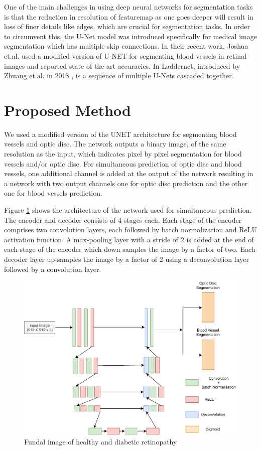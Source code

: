 One of the main challenges in using deep neural networks for segmentation tasks is that the reduction in resolution of featuremap as one goes deeper will result in loss of finer details like edges, which are crucial for segmentation tasks.
In order to circumvent this, the U-Net \cite{ronneberger2015u} model was introduced specifically for medical image segmentation which has multiple skip connections.
In their recent work, Joshua et.al. \cite{joshua2020blood} used a modified version of U-NET for segmenting blood vessels in retinal images and reported state of the art accuracies.
In Laddernet, introduced by Zhuang et.al. in 2018 \cite{zhuang2018laddernet},  is a sequence of multiple U-Nets cascaded together.

\section{Proposed Method}
We used a modified version of the UNET architecture for segmenting blood vessels and optic disc.
The network outputs a binary image, of the same resolution as the input,  which indicates pixel by pixel segmentation for blood vessels and/or optic disc.
For simultaneous prediction of optic disc and blood vessels, one additional channel is added at the output of the network resulting in a network with two output channels one for optic disc prediction and the other one for blood vessels prediction.

Figure \ref {unet_combined}  shows the architecture of the network used for simultaneous prediction.
The encoder and decoder consists of 4 stages each.
Each stage of the encoder comprises two convolution layers, each followed by batch normalization and ReLU activation function.
A max-pooling layer with a stride of 2 is added at the end of each stage of the encoder which down samples the image by a factor of two.
Each decoder layer up-samples the image by a factor of 2 using  a deconvolution layer followed by a convolution layer.

\begin{figure}[!ht]
  \centering
  \includegraphics[width=\linewidth]{images/UnetArch.pdf}
  \caption{Fundal image of healthy and diabetic retinopathy}
  \label{unet_combined}
\end{figure}

